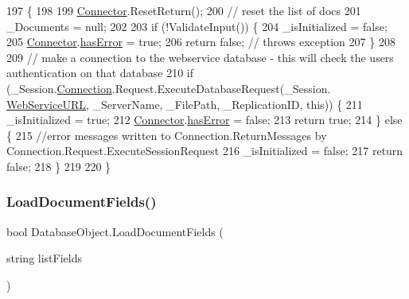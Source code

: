 \begin{DoxyCode}
197                              \{
198 
199         \mbox{\hyperlink{class_connector}{Connector}}.ResetReturn();
200         \textcolor{comment}{// reset the list of docs}
201         \_Documents = null;
202 
203         \textcolor{keywordflow}{if} (!ValidateInput()) \{
204             \_isInitialized = \textcolor{keyword}{false};
205             \mbox{\hyperlink{class_connector}{Connector}}.\mbox{\hyperlink{class_connector_a079bae21a5417efa53bfe8954c0f533f}{hasError}} = \textcolor{keyword}{true};
206             \textcolor{keywordflow}{return} \textcolor{keyword}{false};   \textcolor{comment}{// throws exception}
207         \}
208 
209         \textcolor{comment}{// make a connection to the webservice database - this will check the users authentication on that
       database}
210         \textcolor{keywordflow}{if} (\_Session.\mbox{\hyperlink{class_session_object_a014bdbf705a753540e19bfb53030c55c}{Connection}}.Request.ExecuteDatabaseRequest(\_Session.
      \mbox{\hyperlink{class_session_object_a697c071c812fbf7ad1166b896fb44c16}{WebServiceURL}}, \_ServerName, \_FilePath, \_ReplicationID, \textcolor{keyword}{this})) \{
211             \_isInitialized = \textcolor{keyword}{true};
212             \mbox{\hyperlink{class_connector}{Connector}}.\mbox{\hyperlink{class_connector_a079bae21a5417efa53bfe8954c0f533f}{hasError}} = \textcolor{keyword}{false};
213             \textcolor{keywordflow}{return} \textcolor{keyword}{true};
214         \} \textcolor{keywordflow}{else} \{
215             \textcolor{comment}{//error messages written to Connection.ReturnMessages by
       Connection.Request.ExecuteSessionRequest}
216             \_isInitialized = \textcolor{keyword}{false};
217             \textcolor{keywordflow}{return} \textcolor{keyword}{false};
218         \}
219                 
220     \}
\end{DoxyCode}
\mbox{\label{class_database_object_a88ae0bcda671009e2742858ab945a18c}} 
\subsubsection{\texorpdfstring{Load\+Document\+Fields()}{LoadDocumentFields()}\hspace{0.1cm}{\footnotesize\ttfamily [1/2]}}
{\footnotesize\ttfamily bool Database\+Object.\+Load\+Document\+Fields (\begin{DoxyParamCaption}\item[{string}]{list\+Fields }\end{DoxyParamCaption})}



